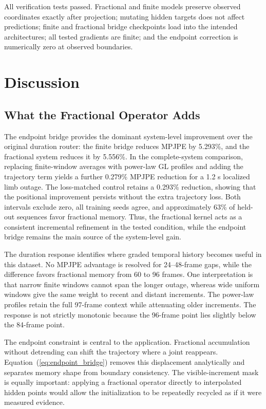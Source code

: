 \documentclass[fractalfract,article,submit,moreauthors,pdftex]{Definitions/mdpi}
\begin{document}
All verification tests passed. Fractional and finite models preserve observed coordinates exactly after projection; mutating hidden targets does not affect predictions; finite and fractional bridge checkpoints load into the intended architectures; all tested gradients are finite; and the endpoint correction is numerically zero at observed boundaries.

\section{Discussion}

\subsection{What the Fractional Operator Adds}

The endpoint bridge provides the dominant system-level improvement over the original duration router: the finite bridge reduces MPJPE by 5.293\%, and the fractional system reduces it by 5.556\%. In the complete-system comparison, replacing finite-window averages with power-law GL profiles and adding the trajectory term yields a further 0.279\% MPJPE reduction for a 1.2 s localized limb outage. The loss-matched control retains a 0.293\% reduction, showing that the positional improvement persists without the extra trajectory loss. Both intervals exclude zero, all training seeds agree, and approximately 63\% of held-out sequences favor fractional memory. Thus, the fractional kernel acts as a consistent incremental refinement in the tested condition, while the endpoint bridge remains the main source of the system-level gain.

The duration response identifies where graded temporal history becomes useful in this dataset. No MPJPE advantage is resolved for 24--48-frame gaps, while the difference favors fractional memory from 60 to 96 frames. One interpretation is that narrow finite windows cannot span the longer outage, whereas wide uniform windows give the same weight to recent and distant increments. The power-law profiles retain the full 97-frame context while attenuating older increments. The response is not strictly monotonic because the 96-frame point lies slightly below the 84-frame point.

The endpoint constraint is central to the application. Fractional accumulation without detrending can shift the trajectory where a joint reappears. Equation~(\ref{eq:endpoint_bridge}) removes this displacement analytically and separates memory shape from boundary consistency. The visible-increment mask is equally important: applying a fractional operator directly to interpolated hidden points would allow the initialization to be repeatedly recycled as if it were measured evidence.
\end{document}
